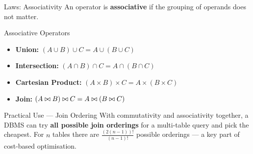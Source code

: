 \begin{frame}{Laws: Associativity}
  An operator is \textbf{associative} if the grouping of operands does not
  matter.

  \begin{block}{Associative Operators}
    \begin{itemize}
      \item \textbf{Union:}
            $(A \cup B) \cup C = A \cup (B \cup C)$
      \item \textbf{Intersection:}
            $(A \cap B) \cap C = A \cap (B \cap C)$
      \item \textbf{Cartesian Product:}
            $(A \times B) \times C = A \times (B \times C)$
      \item \textbf{Join:}
            $(A \bowtie B) \bowtie C = A \bowtie (B \bowtie C)$
    \end{itemize}
  \end{block}

  \begin{block}{Practical Use --- Join Ordering}
    With commutativity and associativity together, a DBMS can try
    \textbf{all possible join orderings} for a multi-table query and pick
    the cheapest.  For $n$ tables there are $\frac{(2(n-1))!}{(n-1)!}$
    possible orderings --- a key part of cost-based optimisation.
  \end{block}
\end{frame}

